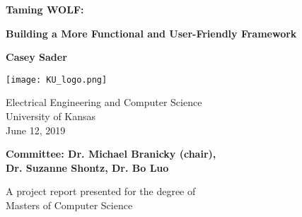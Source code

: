 \begin{titlepage}
	\begin{center}
		\vspace*{1cm}
		
		\Huge
		\textbf{Taming WOLF:}
		
		\vspace{0.5cm}
		\Large
		\textbf
		{Building a More Functional and User-Friendly Framework}
		
		\vspace{2cm}
		
		\LARGE
		\textbf{Casey Sader}
		
		\vspace{2cm}
		\texttt{[image: KU\_logo.png]}
		
		\vspace{0.5cm}
		
		
		\large
		Electrical Engineering and Computer Science\\
		University of Kansas\\
		June 12, 2019
		\vfill
		
		\Large
		\textbf{
		Committee: Dr. Michael Branicky (chair), \\
		Dr. Suzanne Shontz, Dr. Bo Luo}
		
		\vspace{1cm}
		\large
		A project report presented for the degree of\\
		Masters of Computer Science
		
	\end{center}
\end{titlepage}